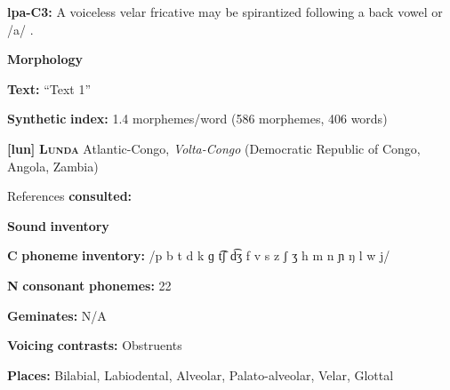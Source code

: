 \documentclass[output=paper]{langsci/langscibook}
\begin{document}
\begin{styleBody}
\textbf{lpa-C3:} A voiceless velar fricative may be spirantized following a back vowel or /a/ \citep[20]{Lacrampe2014}.
\end{styleBody}

\begin{styleBody}
\textbf{Morphology}
\end{styleBody}

\begin{styleBody}
\textbf{Text:} “Text 1” \citep[495-500]{Lacrampe2014}
\end{styleBody}

\begin{styleBody}
\textbf{Synthetic} \textbf{index:} 1.4 morphemes/word (586 morphemes, 406 words)
\end{styleBody}

\begin{styleBody}
\textbf{[lun]}   \textbf{\textsc{Lunda}  }  Atlantic-Congo, \textit{Volta-Congo} (Democratic Republic of Congo, Angola, Zambia)
\end{styleBody}

\begin{styleBody}
References \textbf{consulted:} \citet{Kawasha2003}
\end{styleBody}

\begin{styleBody}
\textbf{Sound} \textbf{inventory}
\end{styleBody}

\begin{styleBody}
\textbf{C} \textbf{phoneme} \textbf{inventory:} /p b t d k ɡ t͡ʃ d͡ʒ f v s z ʃ ʒ h m n ɲ ŋ l w j/
\end{styleBody}

\begin{styleBody}
\textbf{N} \textbf{consonant} \textbf{phonemes:} 22
\end{styleBody}

\begin{styleBody}
\textbf{Geminates:} N/A
\end{styleBody}

\begin{styleBody}
\textbf{Voicing} \textbf{contrasts:} Obstruents
\end{styleBody}

\begin{styleBody}
\textbf{Places:} Bilabial, Labiodental, Alveolar, Palato-alveolar, Velar, Glottal
\end{styleBody}
\end{document}
